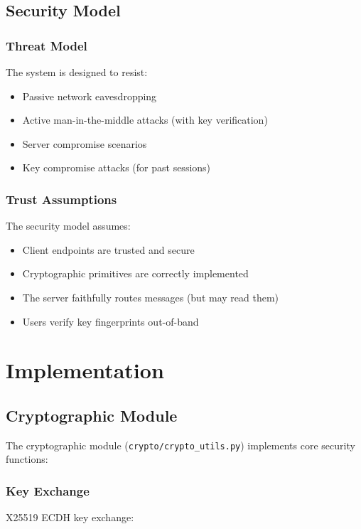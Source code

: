 \documentclass[conference]{IEEEtran}
\begin{document}
\subsection{Security Model}

\subsubsection{Threat Model}
The system is designed to resist:

\begin{itemize}
    \item Passive network eavesdropping
    \item Active man-in-the-middle attacks (with key verification)
    \item Server compromise scenarios
    \item Key compromise attacks (for past sessions)
\end{itemize}

\subsubsection{Trust Assumptions}
The security model assumes:

\begin{itemize}
    \item Client endpoints are trusted and secure
    \item Cryptographic primitives are correctly implemented
    \item The server faithfully routes messages (but may read them)
    \item Users verify key fingerprints out-of-band
\end{itemize}

\section{Implementation}

\subsection{Cryptographic Module}

The cryptographic module (\texttt{crypto/crypto\_utils.py}) implements core security functions:

\subsubsection{Key Exchange}
X25519 ECDH key exchange:
\end{document}
